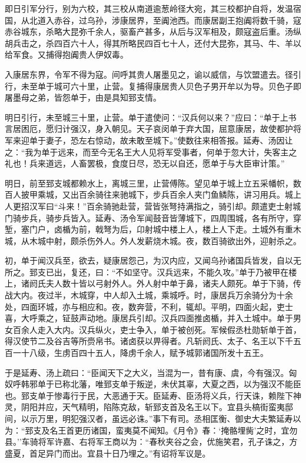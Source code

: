 \documentclass[]{article}
\begin{document}
即日引军分行，别为六校，其三校从南道逾葱岭径大宛，其三校都护自将，发温宿国，从北道入赤谷，过乌孙，涉康居界，至阗池西。而康居副王抱阗将数千骑，寇赤谷城东，杀略大昆弥千余人，驱畜产甚多，从后与汉军相及，颇寇盗后重。汤纵胡兵击之，杀四百六十人，得其所略民四百七十人，还付大昆弥，其马、牛、羊以给军食。又捕得抱阗贵人伊奴毒。

入康居东界，令军不得为寇。间呼其贵人屠墨见之，谕以威信，与饮盟遣去。径引行，未至单于城可六十里，止营。复捕得康居贵人贝色子男开牟以为导。贝色子即屠墨母之弟，皆怨单于，由是具知郅支情。

明日引行，未至城三十里，止营。单于遣使问：``汉兵何以来？''应曰：``单于上书言居困厄，愿归计强汉，身入朝见。天子哀闵单于弃大国，屈意康居，故使都护将军来迎单于妻子，恐左右惊动，故未敢至城下。''使数往来相答报。延寿、汤因让之：``我为单于远来，而至今无名王大人见将军受事者，何单于忽大计，失客主之礼也！兵来道远，人畜罢极，食度日尽，恐无以自还，愿单于与大臣审计策。''

明日，前至郅支城都赖水上，离城三里，止营傅陈。望见单于城上立五采幡帜，数百人披甲乘城，又出百余骑往来驰城下，步兵百余人夹门鱼鳞陈，讲习用兵。城上人更招汉军曰``斗来！''百余骑驰赴营，营皆张弩持满指之，骑引却。颇遣吏士射城门骑步兵，骑步兵皆入。延寿、汤令军闻鼓音皆薄城下，四周围城，各有所守，穿堑，塞门户，卤楯为前，戟弩为后，卬射城中楼上人，楼上人下走。土城外有重木城，从木城中射，颇杀伤外人。外人发薪烧木城。夜，数百骑欲出外，迎射杀之。

初，单于闻汉兵至，欲去，疑康居怨己，为汉内应，又闻乌孙诸国兵皆发，自以无所之。郅支已出，复还，曰：``不如坚守。汉兵远来，不能久攻。''单于乃被甲在楼上，诸阏氏夫人数十皆以弓射外人。外人射中单于鼻，诸夫人颇死。单于下骑，传战大内。夜过半，木城穿，中人却入土城，乘城呼。时，康居兵万余骑分为十余处，四面环城，亦与相应和。夜，数奔营，不利，辄却。平明，四面火起，吏士喜，大呼乘之，钲鼓声动地。康居兵引却。汉兵四面推卤楯，并入土城中。单于男女百余人走入大内。汉兵纵火，吏士争入，单于被创死。军候假丞杜勋斩单于首，得汉使节二及谷吉等所赍帛书。诸卤获以畀得者。凡斩阏氏、太子、名王以下千五百一十八级，生虏百四十五人，降虏千余人，赋予城郭诸国所发十五王。

于是延寿、汤上疏曰：``臣闻天下之大义，当混为一，昔有康、虞，今有强汉。匈奴呼韩邪单于已称北藩，唯郅支单于叛逆，未伏其辜，大夏之西，以为强汉不能臣也。郅支单于惨毒行于民，大恶通于天。臣延寿、臣汤将义兵，行天诛，赖陛下神灵，阴阳并应，天气精明，陷陈克敌，斩郅支首及名王以下。宜县头槁街蛮夷邸间，以示万里，明犯强汉者，虽远必诛。''事下有司。丞相匡衡、御史大夫繁延寿以为：``郅支及名王首更历诸国，蛮夷莫不闻知。《月令》春：`掩骼埋胔'之时，宜勿县。''车骑将军许嘉、右将军王商以为：``春秋夹谷之会，优施笑君，孔子诛之，方盛夏，首足异门而出。宜县十日乃埋之。''有诏将军议是。
\end{document}
